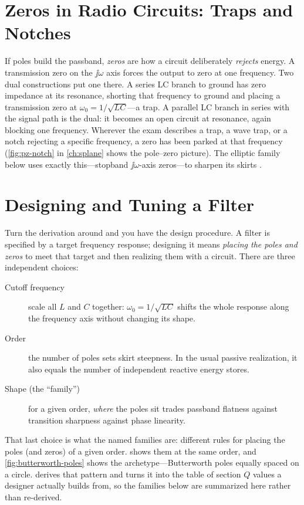 \section{Zeros in Radio Circuits: Traps and Notches}
If poles build the passband, \emph{zeros} are how a circuit deliberately
\emph{rejects} energy. A transmission zero on the \(\jj\omega\) axis forces the
output to zero at one frequency. Two dual constructions put one there. A series LC
branch to ground has zero impedance at its resonance, shorting that frequency to
ground and placing a transmission zero at \(\omega_0=1/\sqrt{LC}\)---a trap. A
parallel LC branch in series with the signal path is the dual: it becomes an open
circuit at resonance, again blocking one frequency. Wherever the exam describes a
trap, a wave trap, or a notch rejecting a specific frequency, a zero has been
parked at that frequency (\cref{fig:pz-notch} in \cref{ch:splane} shows the
pole--zero picture). The elliptic family below uses exactly this---stopband
\(\jj\omega\)-axis zeros---to sharpen its skirts
\cite[pp.~209--220]{free2022rfmicrowave}.

\section{Designing and Tuning a Filter}
Turn the derivation around and you have the design procedure. A filter is
specified by a target frequency response; designing it means \emph{placing the
poles and zeros} to meet that target and then realizing them with a circuit.
There are three independent choices:
\begin{description}
\item[Cutoff frequency] scale all \(L\) and \(C\) together: \(\omega_0=1/\sqrt{LC}\)
shifts the whole response along the frequency axis without changing its shape.
\item[Order] the number of poles sets skirt steepness. In the usual passive
realization, it also equals the number of independent reactive energy stores.
\item[Shape (the ``family'')] for a given order, \emph{where} the poles sit trades
passband flatness against transition sharpness against phase linearity.
\end{description}

That last choice is what the named families are: different rules for placing the
poles (and zeros) of a given order.  shows them at the
same order, and \cref{fig:butterworth-poles} shows the archetype---Butterworth
poles equally spaced on a circle.  derives that pattern
and turns it into the table of section \(Q\) values a designer actually builds
from, so the families below are summarized here rather than re-derived.

